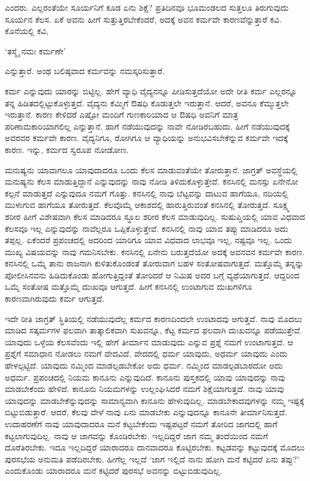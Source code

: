 ಎಂದರು. ಎಲ್ಲರಂತೆಯೇ ಸೂರ್ಯನಿಗೆ ಕೂಡ ಏನು ಶಿಕ್ಷೆ? ಪ್ರತಿದಿನವೂ ಭೂಮಂಡಲದ ಸುತ್ತಲೂ ತಿರುಗುವುದು ಸೂರ್ಯನ ಕೆಲಸ. ಏಕೆ ಅವನು ಹೀಗೆ ಸುತ್ತುತ್ತಿರಬೇಕೆಂದರೆ, ಅದಕ್ಕೆ ಅವನ ಕರ್ಮವೇ ಕಾರಣವೆನ್ನುತ್ತಾರೆ ಕವಿ. ಕೊನೆಯಲ್ಲಿ ಕವಿ,

\begin{shloka}
`ತಸ್ಮೈ ನಮಃ ಕರ್ಮಣೇ'
\end{shloka}

ಎನ್ನುತ್ತಾರೆ. ಅಂಥ ಬಲಿಷ್ಠವಾದ ಕರ್ಮವನ್ನು ನಮಸ್ಕರಿಸುತ್ತಾರೆ.

ಕರ್ಮ ಎನ್ನುವುದು ಯಾರನ್ನು ಬಿಟ್ಟಿಲ್ಲ. ಹೇಗೆ ವ್ಯಾಧಿ ವೈದ್ಯನನ್ನೂ ಪೀಡಿಸುತ್ತದೆಯೋ ಅದೇ ರೀತಿ ಕರ್ಮ ಎಲ್ಲರನ್ನೂ ತನ್ನ ಹಿಡಿತದಲ್ಲಿಟ್ಟುಕೊಳ್ಳುತ್ತದೆ. ವೈದ್ಯನು ಕೆಮ್ಮಿಗೆ ಔಷಧಿ ಕೊಡುತ್ತಲೇ ಇರುತ್ತಾನೆ. ಆದರೆ, ಅವನೂ ಕೆಮ್ಮುತ್ತಲೇ ಇರುತ್ತಾನೆ. ಕಾರಣ ಕೇಳಿದರೆ ಎಷ್ಟೋ ಮಂದಿಗೆ ಗುಣಕಾರಿಯಾದ ಆ ಔಷಧಿ ಅವನಿಗೆ ಮಾತ್ರ ಪರಿಣಾಮಕಾರಿಯಾಗಲಿಲ್ಲ ಎನ್ನುತ್ತಾನೆ. ಹಾಗೆ ನಡೆಯುವುದನ್ನು ನಾವೇ ನೋಡಿರಬಹುದು. ಹೀಗೆ ನಡೆಯುವುದಕ್ಕೆ ಅವರವರ ಕರ್ಮವೇ ಕಾರಣ. ವೈದ್ಯನಿಗೂ, ರೋಗಿಗೂ ಆ ವ್ಯಾಧಿಯನ್ನು ಅನುಭವಿಸಬೇಕೆನ್ನುವ ಕರ್ಮವೇ ಇದಕ್ಕೆ ಕಾರಣ. ಇನ್ನು, ಕರ್ಮದ ಸ್ವರೂಪ ನೋಡೋಣ.

ಮನುಷ್ಯನು ಯಾವಾಗಲೂ ಯಾವುದಾದರೂ ಒಂದು ಕೆಲಸ ಮಾಡುವಂತೆಯೇ ತೋರುತ್ತಾನೆ. ಜಾಗ್ರತ್ ಅವಸ್ಥೆಯಲ್ಲಿ ಮನುಷ್ಯನು ಕೆಲಸ ಮಾಡುತ್ತಿದ್ದಾನೆ ಎನ್ನುವುದನ್ನು ನಾವು ನೋಡಿ ತಿಳಿದುಕೊಳ್ಳುತ್ತೇವೆ. ಕನಸಿನಲ್ಲಿ ಮನಸ್ಸು ಏನೇನೋ ಕಲ್ಪನೆ ಮಾಡುತ್ತದೆ ಎನ್ನುವುದೂ ನಮಗೆ ಗೊತ್ತು. ಕನಸಿನಲ್ಲಿ ನಾವು ಬೆಟ್ಟವನ್ನು ದಾಟುವ ಹಾಗೆಯೂ, ನದಿಯಲ್ಲಿ ಮುಳುಗುವ ಹಾಗೆಯೂ ತೋರುತ್ತದೆ. ಕೆಲವೊಮ್ಮೆ ಆಕಾಶದಲ್ಲಿ ಹಾರುತ್ತಿರುವಂತೆ ಕನಸಿನಲ್ಲಿ ತೋರುತ್ತದೆ. ಸೂಕ್ಷ್ಮ ಶರೀರ ಹೀಗೆ ವಿಶೇಷವಾಗಿ ಕೆಲಸ ಮಾಡಿದರೂ ಸ್ಥೂಲ ಶರೀರ ಕೆಲಸ ಮಾಡುವುದಿಲ್ಲ. ಸುಷುಪ್ತಿಯಲ್ಲಿ ಯಾವ ವಿಧವಾದ ಕೆಲಸವೂ ಇಲ್ಲ ಎನ್ನುವುದನ್ನು ನಾವೆಲ್ಲರೂ ಒಪ್ಪಿಕೊಳ್ಳುತ್ತೇವೆ. ಕನಸಿನಲ್ಲಿ ನಾವು ಯಾವ ತಪ್ಪು ಮಾಡಿದರೂ ಅದು ತಪ್ಪಲ್ಲ. ಏಕೆಂದರೆ ಪ್ರಪಂಚದಲ್ಲಿ ಅದರಿಂದ ಯಾರಿಗೂ ಯಾವ ವಿಧವಾದ ಲಾಭವೂ ಇಲ್ಲ, ನಷ್ಟವೂ ಇಲ್ಲ. ಒಂದು ಮುಖ್ಯ ವಿಷಯವನ್ನು ನಾವು ಗಮನಿಸಬೇಕು. ಕನಸಿನಲ್ಲಿ ಏನೇನು ಬರುತ್ತದೆಯೋ ಅದಕ್ಕೆ ಅವನವನ ಕರ್ಮವೇ ಕಾರಣ. ಕನಸಿನಲ್ಲಿ ಒಮ್ಮೆ ತಾನು ರಾಜನಾಗಿ ಕುಳಿತುಕೊಂಡಂತೆ ತೋರುವಾಗ ಬಹಳ ಸಂತೋಷವಾಗುತ್ತದೆ. ಮತ್ತೊಮ್ಮೆ ತನ್ನನ್ನು ಪೋಲೀಸಿನವನು ಹಿಡಿದುಕೊಂಡು ಹೋಗುತ್ತಿದ್ದಂತೆ ತೋರಿದರೆ ಆ ನಿಮಿಷ ಅದರ ಬಗ್ಗೆ ವ್ಯಥೆಯಾಗುತ್ತದೆ. ಆದ್ದರಿಂದ ಒಮ್ಮೆ ಸಂತೋಷ ಮತ್ತೊಮ್ಮೆ ದುಃಖವೂ ಆಗುತ್ತದೆ. ಹೀಗೆ ಕನಸಿನಲ್ಲಿ ಉಂಟಾಗುವ ದುಃಖಗಳಿಗೂ ಕಾರಣವಾಗಿರುವುದು ಕರ್ಮ ಆಗುತ್ತದೆ.

ಇದೇ ರೀತಿ ಜಾಗ್ರತ್ ಸ್ಥಿತಿಯಲ್ಲಿ ನಡೆಯುವುದೆಲ್ಲ ಕರ್ಮದ ಕಾರಣದಿಂದಲೇ ಉಂಟಾದವು ಆಗುತ್ತವೆ. ನಾವು ಮೊದಲು ಮಾಡಿದ ಸತ್ಕರ್ಮಗಳ ಫಲವಾಗಿ ತಾತ್ಕಾಲಿಕವಾಗಿ ಸುಖವನ್ನೂ, ಕೆಟ್ಟ ಕರ್ಮದ ಫಲವಾಗಿ ದುಃಖವನ್ನೂ ಪಡೆಯುತ್ತೇವೆ. ಯಾವುದು ಒಳ್ಳೆಯ ಕೆಲಸವೆಂದು ಇಲ್ಲಿ ಹೇಗೆ ತೀರ್ಮಾನ ಮಾಡುವುದು ಎನ್ನುವ ಪ್ರಶ್ನೆ ನಮಗೆ ಉಂಟಾಗುತ್ತದೆ. ಆ ಪ್ರಶ್ನೆಗೆ ಸಮಾಧಾನ ನೋಡಲು ನಮಗೆ ವೇದವಿದೆ. ವೇದದಲ್ಲಿ ಧರ್ಮ ಯಾವುದು, ಅಧರ್ಮ ಯಾವುದು ಎಂದು ಹೇಳಲ್ಪಟ್ಟಿದೆ. ಯಾವುದು ನಮ್ಮಿಂದ ಮಾಡಲ್ಪಡಬೇಕೋ ಅದು ಧರ್ಮ. ನಮ್ಮಿಂದ ಮಾಡಲ್ಪಡಬಾರದೋ ಅದು ಅಧರ್ಮ. ಪ್ರಪಂಚದಲ್ಲಿ ನಿಯಮ ಕಾನೂನು ಎನ್ನುವುದಿದೆ. ಕಾನೂನು ಪುಸ್ತಕದಲ್ಲಿ ಯಾವು ಯಾವುದನ್ನು ನಾವು ಮಾಡಬೇಕೆಂದು ಹೇಳಿದೆ. ಕಾನೂನು ನಿಯಮಗಳನ್ನು ಉಲ್ಲಂಘಿಸಿದರೆ ನಮಗೆ ಶಿಕ್ಷೆಯಾಗುತ್ತದೆ. ನಾವು ಯಾವು ಯಾವುದನ್ನು ಮಾಡಬೇಕೆನ್ನುವುದನ್ನು ಸಾಮಾನ್ಯವಾಗಿ ಕಾನೂನು ಹೇಳುವುದಿಲ್ಲ. ಮಾಡಬೇಕಾದವುಗಳನ್ನು ನಮ್ಮ ಇಷ್ಟಕ್ಕೆ ಬಿಟ್ಟುಬಿಡುತ್ತಾರೆ. ಆದರೆ, ಕೆಲವು ವೇಳೆ ನಾವು ಏನು ಮಾಡಬೇಕು ಎನ್ನುವುದನ್ನೂ ಕಾನೂನೇ ತೀರ್ಮಾನಿಸುತ್ತದೆ. ಉದಾಹರಣೆಗೆ ನಾವು ಯಾವುದಾದರೂ ಮನೆ ಕಟ್ಟಬೇಕೆಂದು ಇಷ್ಟಪಟ್ಟರೆ ನಮಗೆ ತೋರಿದ ಜಾಗದಲ್ಲಿ ಹಾಗೆ ಕಟ್ಟಲಾಗುವುದಿಲ್ಲ. ನಾವು ಆ ಜಾಗವನ್ನು ಕೊಂಡಿರಬೇಕು. ಇಲ್ಲದಿದ್ದರೆ ಜಾಗ ನಮ್ಮ ತಂದೆಯಿಂದ ನಮಗೆ ದೊರೆತಿರಬೇಕು. ಇದೂ ಇಲ್ಲದಿದ್ದರೆ ಯಾರಾದರೂ ದಾನವಾದರೂ ಕೊಟ್ಟಿರಬೇಕು. ಕಟ್ಟಡವನ್ನು ಕಟ್ಟುವುದಕ್ಕೆ ಮೊದಲು ಪುರಸಭೆಯ ಅನುಮತಿ ಪಡೆದಿರಬೇಕು. ಹೀಗೆಲ್ಲ ಇಲ್ಲದೆ `ಜಾಗ ಇಲ್ಲಿದೆ ನಾನು ಹೋಗಿ ಮನೆ ಕಟ್ಟಿದರೆ ಏನು ತಪ್ಪು?' ಎಂದುಕೊಂಡು ಯಾರಾದರೂ ಮನೆ ಕಟ್ಟಿದರೆ ಪುರಸಭೆ ಅವನನ್ನು ಬಿಟ್ಟುಬಿಡುವುದಿಲ್ಲ.

